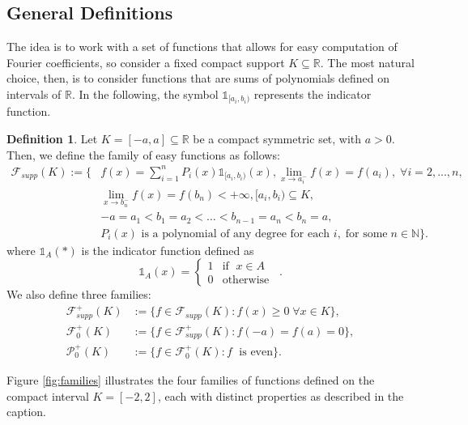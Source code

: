 \documentclass[preprint,hidelinks,authoryear]{elsarticle}
\theoremstyle{plain}
\theoremstyle{definition}
\newtheorem{definition}[theorem]{Definition}
\theoremstyle{remark}
\begin{document}
{\subsection{General Definitions}
\label{sec:maindef}
The idea is to work with a set of functions that allows for easy computation of Fourier coefficients, so consider a fixed compact support $ K \subseteq \mathbb{R} $. The most natural choice, then, is to consider functions that are sums of polynomials defined on intervals of $ \mathbb{R} $. In the following, the symbol $ \mathds{1}_{[a_i,b_i)} $ represents the indicator function.
\begin{definition} 
Let $ K = [-a,a] \subseteq \mathbb{R} $ be a compact symmetric set, with $a>0$. Then, we define the family of easy functions as follows:
\begin{equation}
\label{facilisuppK}
\begin{aligned}
    \mathcal{F}_{supp}(K) := \Biggl\{& f(x) = \sum_{i=1}^n P_i(x) \mathds{1}_{[a_i,b_i)}(x),\displaystyle\lim_{x \to a^{-}_i}f(x)=f(a_i), \; \forall i=2,...,n,   \; \\&\displaystyle\lim_{x \to b_n^-}f(x)=f(b_n) < +\infty, [a_i, b_i) \subseteq K, \;\\& -a = a_1 < b_1 = a_2 < \dots < b_{n-1} = a_n < b_n = a, \\
    &P_i(x) \text{ is a polynomial of any degree for each } i, \; \text{for some} \; n \in \mathbb{N} \Biggr\}.
\end{aligned}
\end{equation}
where $\mathds{1}_{A}(*)$ is the indicator function defined as $$\mathds{1}_{A}(x)=\begin{cases} 1 & \mbox{if } \; x \in A \\ 0 & \mbox{otherwise }
\end{cases}\,.$$
We also define three families:
\begin{align}
     \mathcal{F}^+_{supp}(K)&:=\{f \in \mathcal{F}_{supp}(K) : f(x) \ge 0 \; \forall x \in K\}
     \label{funioni+}, \\
     \mathcal{F}^+_{0}(K)&:=\{f \in \mathcal{F}^+_{supp}(K) : f(-a)=f(a)=0 \},
     \label{funzioni+0} \\
     \mathcal{P}^+_{0}(K)&:=\{f \in \mathcal{F}^+_{0}(K) : f \; \text{ is even} \}   .    \label{funzionipari}
\end{align}
\end{definition}
Figure \ref{fig:families} illustrates the four families of functions defined on the compact interval $K = [-2, 2]$, each with distinct properties as described in the caption.
}
\end{document}
